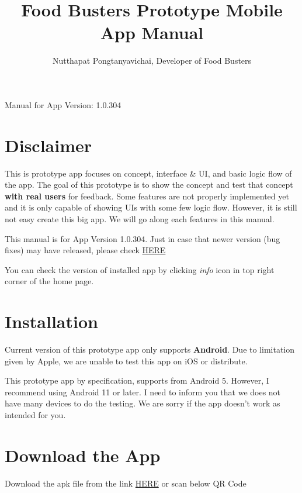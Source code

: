\documentclass[a4paper,12pt]{article}
\begin{document}
\title{\textbf{Food Busters Prototype Mobile App Manual}}
\author{Nutthapat Pongtanyavichai, Developer of Food Busters}

\maketitle
\centerline{\LARGE{Manual for App Version: 1.0.304}}

\tableofcontents

\pagebreak
\section{Disclaimer}

This is prototype app focuses on concept, interface \& UI, and basic logic flow of the app.
The goal of this prototype is to show the concept and test that concept \textbf{with real users}
for feedback. Some features are not properly implemented yet and it is only capable
of showing UIs with some few logic flow. However, it is still not easy create this big app.
We will go along each features in this manual.

This manual is for App Version 1.0.304. Just in case that newer version (bug fixes)
may have released, please check \href{https://github.com/Food-Busters/food_busters/releases}{HERE}

You can check the version of installed app by clicking \textit{info} icon in
top right corner of the home page.

\section{Installation}

Current version of this prototype app only supports \textbf{Android}. Due to
limitation given by Apple, we are unable to test this app on iOS or distribute.

This prototype app by specification, supports from Android 5.
However, I recommend using Android 11 or later.
I need to inform you that we does not have many devices to do the testing.
We are sorry if the app doesn't work as intended for you.

\section*{Download the App}

\noindent
\begin{simplechar}
    Download the apk file from the link \href{https://github.com/Food-Busters/food_busters/releases/download/1.0.304/food_busters-1.0.304.apk}{HERE} or scan below QR Code
\end{simplechar}
\end{document}
